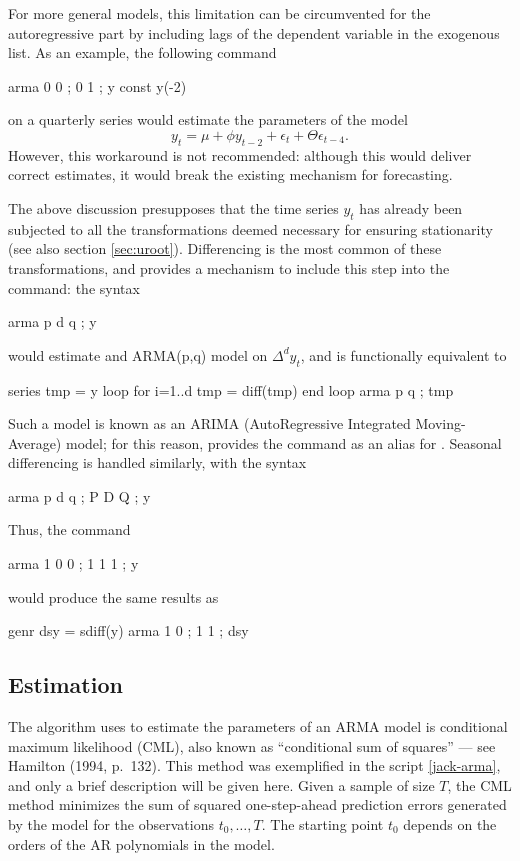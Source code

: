 For more general models, this limitation can be circumvented for the
autoregressive part by including lags of the dependent variable in the
exogenous list. As an example, the following command 
\begin{code}
  arma 0 0 ; 0 1 ; y const y(-2)
\end{code}
on a quarterly series would estimate the parameters of the model
\[
  y_t = \mu + \phi y_{t-2} + \epsilon_t + \Theta \epsilon_{t-4}.
\]
However, this workaround is not recommended: although this would
deliver correct estimates, it would break the existing mechanism for
forecasting.

The above discussion presupposes that the time series $y_t$ has
already been subjected to all the transformations deemed necessary for
ensuring stationarity (see also section \ref{sec:uroot}). Differencing
is the most common of these transformations, and  provides
a mechanism to include this step into the  command: the
syntax
\begin{code}
  arma p d q ; y 
\end{code}
would estimate and ARMA(p,q) model on $\Delta^d y_t$, and is
functionally equivalent to 
\begin{code}
  series tmp = y
  loop for i=1..d
    tmp = diff(tmp)
  end loop
  arma p q ; tmp 
\end{code}
Such a model is known as an ARIMA (AutoRegressive Integrated
Moving-Average) model; for this reason,  provides the
 command as an alias for . Seasonal differencing
is handled similarly, with the syntax
\begin{code}
  arma p d q ; P D Q ; y 
\end{code}
Thus, the command 
\begin{code}
  arma 1 0 0 ; 1 1 1 ; y 
\end{code}
would produce the same results as
\begin{code}
  genr dsy = sdiff(y)
  arma 1 0 ; 1 1 ; dsy 
\end{code}

\subsection{Estimation}
\label{arma-est}

The algorithm  uses to estimate the parameters of an ARMA
model is conditional maximum likelihood (CML), also known as
``conditional sum of squares'' --- see Hamilton (1994, p.\ 132).  This
method was exemplified in the script \ref{jack-arma}, and only a brief
description will be given here.  Given a sample of size $T$, the CML
method minimizes the sum of squared one-step-ahead prediction errors
generated by the model for the observations $t_0, \ldots, T$. The
starting point $t_0$ depends on the orders of the AR polynomials in the
model.

